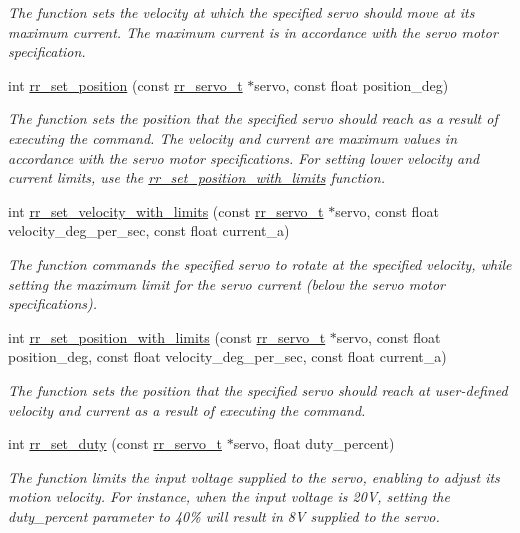 \begin{DoxyCompactItemize}
\begin{DoxyCompactList}\small\item\em The function sets the velocity at which the specified servo should move at its maximum current. The maximum current is in accordance with the servo motor specification. \end{DoxyCompactList}\item 
int \hyperlink{group___motion_gaddb31db79640ec345eb237ddc4d1078f}{rr\+\_\+set\+\_\+position} (const \hyperlink{structrr__servo__t}{rr\+\_\+servo\+\_\+t} $\ast$servo, const float position\+\_\+deg)
\begin{DoxyCompactList}\small\item\em The function sets the position that the specified servo should reach as a result of executing the command. The velocity and current are maximum values in accordance with the servo motor specifications. For setting lower velocity and current limits, use the \hyperlink{group___motion_ga6927d2a1d6ef5a0564b676817c88b82a}{rr\+\_\+set\+\_\+position\+\_\+with\+\_\+limits} function. \end{DoxyCompactList}\item 
int \hyperlink{group___motion_ga252ba86c50217d9ccf08deaf4c75f2e7}{rr\+\_\+set\+\_\+velocity\+\_\+with\+\_\+limits} (const \hyperlink{structrr__servo__t}{rr\+\_\+servo\+\_\+t} $\ast$servo, const float velocity\+\_\+deg\+\_\+per\+\_\+sec, const float current\+\_\+a)
\begin{DoxyCompactList}\small\item\em The function commands the specified servo to rotate at the specified velocity, while setting the maximum limit for the servo current (below the servo motor specifications). \end{DoxyCompactList}\item 
int \hyperlink{group___motion_ga6927d2a1d6ef5a0564b676817c88b82a}{rr\+\_\+set\+\_\+position\+\_\+with\+\_\+limits} (const \hyperlink{structrr__servo__t}{rr\+\_\+servo\+\_\+t} $\ast$servo, const float position\+\_\+deg, const float velocity\+\_\+deg\+\_\+per\+\_\+sec, const float current\+\_\+a)
\begin{DoxyCompactList}\small\item\em The function sets the position that the specified servo should reach at user-\/defined velocity and current as a result of executing the command. \end{DoxyCompactList}\item 
int \hyperlink{group___motion_ga67890b1af333ce15f291a24ddc5760d1}{rr\+\_\+set\+\_\+duty} (const \hyperlink{structrr__servo__t}{rr\+\_\+servo\+\_\+t} $\ast$servo, float duty\+\_\+percent)
\begin{DoxyCompactList}\small\item\em The function limits the input voltage supplied to the servo, enabling to adjust its motion velocity. For instance, when the input voltage is 20V, setting the duty\+\_\+percent parameter to 40\% will result in 8V supplied to the servo. \end{DoxyCompactList}\end{DoxyCompactItemize}


